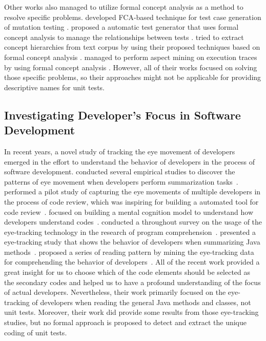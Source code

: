 Other works also managed to utilize formal concept analysis as a method to resolve specific problems.
%
\citeauthor{he2011test} developed FCA-based technique for test case generation of mutation testing \cite{he2011test}.
%
\citeauthor{khor2004using} proposed a automatic test generator that uses formal concept analysis to manage the relationships between tests \cite{khor2004using}.
%
\citeauthor{cimiano2005learning} tried to extract concept hierarchies from text corpus by using their proposed techniques based on formal concept analysis \cite{cimiano2005learning}.
%
\citeauthor{tonella2004aspect} managed to perform aspect mining on execution traces by using formal concept analysis \cite{tonella2004aspect}.
%
However, all of their works focused on solving those specific problems, so their approaches might not be applicable for providing descriptive names for unit tests.


\subsection{Investigating Developer's Focus in Software Development}

In recent years, a novel study of tracking the eye movement of developers emerged in the effort to understand the behavior of developers in the process of software development.
%
\citeauthor{rodeghero2015empirical} conducted several empirical studies to discover the patterns of eye movement when developers perform summarization tasks~\cite{rodeghero2015eye,rodeghero2015empirical,rodeghero2014improving}.
%
\citeauthor{begel2018eye} performed a pilot study of capturing the eye movements of multiple developers in the process of code review, which was inspiring for building a automated tool for code review~\cite{begel2018eye}.
%
\citeauthor{abid2019using} focused on building a mental cognition model to understand how developers understand codes~\cite{abid2019using}.
%
\citeauthor{obaidellah2018survey} conducted a throughout survey on the usage of the eye-tracking technology in the research of program comprehension~\cite{obaidellah2018survey}.
%
\citeauthor{abid2019developer} presented a eye-tracking study that shows the behavior of developers when summarizing Java methods~\cite{abid2019developer}.
%
\citeauthor{ioannou2020mining} proposed a series of reading pattern by mining the eye-tracking data for comprehending the behavior of developers~\cite{ioannou2020mining}.
%
All of the recent work provided a great insight for us to choose which of the code elements should be selected as the secondary codes and helped us to have a profound understanding of the focus of actual developers.
%
Nevertheless, their work primarily focused on the eye-tracking of developers when reading the general Java methods and classes, not unit tests.
%
Moreover, their work did provide some results from those eye-tracking studies, but no formal approach is proposed to detect and extract the unique coding of unit tests.

